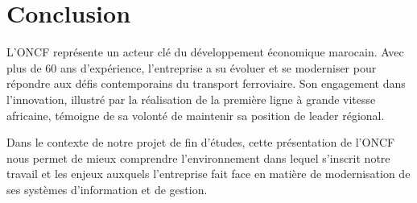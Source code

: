 \section{Conclusion}

L'ONCF représente un acteur clé du développement économique marocain. Avec plus de 60 ans d'expérience, l'entreprise a su évoluer et se moderniser pour répondre aux défis contemporains du transport ferroviaire. Son engagement dans l'innovation, illustré par la réalisation de la première ligne à grande vitesse africaine, témoigne de sa volonté de maintenir sa position de leader régional.

Dans le contexte de notre projet de fin d'études, cette présentation de l'ONCF nous permet de mieux comprendre l'environnement dans lequel s'inscrit notre travail et les enjeux auxquels l'entreprise fait face en matière de modernisation de ses systèmes d'information et de gestion.